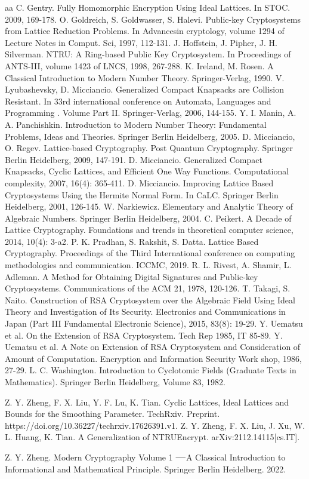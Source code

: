 \documentclass [11pt]{article}
\begin{document}
\begin{thebibliography}{aa}
 C. Gentry.  Fully Homomorphic Encryption Using Ideal Lattices. In  STOC. 2009, 169-178.
 O. Goldreich, S. Goldwasser, S. Halevi.  Public-key Cryptosystems from Lattice Reduction Problems. In Advancesin cryptology, volume 1294 of Lecture Notes in Comput. Sci, 1997, 112-131.
 J. Hoffstein, J. Pipher, J. H. Silverman. NTRU:  A Ring-based Public Key Cryptosystem. In Proceedings of ANTS-III, volume 1423 of LNCS, 1998, 267-288.
 K. Ireland, M. Rosen. A Classical Introduction to Modern Number Theory. Springer-Verlag, 1990.
V. Lyubashevsky, D. Micciancio. Generalized Compact Knapsacks are Collision Resistant.  In 33rd international conference on Automata, Languages and Programming . Volume Part II. Springer-Verlag, 2006, 144-155.
 Y. I. Manin,  A. A. Panchishkin. Introduction to Modern Number Theory: Fundamental Problems, Ideas and Theories. Springer Berlin Heidelberg,  2005.
 D. Micciancio, O. Regev. Lattice-based Cryptography.  Post Quantum Cryptography. Springer Berlin Heidelberg, 2009, 147-191.
D. Micciancio. Generalized Compact Knapsacks, Cyclic Lattices, and Efficient One Way Functions. Computational complexity, 2007, 16(4): 365-411.
D. Micciancio.  Improving Lattice Based Cryptosystems Using the Hermite Normal Form. In CaLC. Springer Berlin  Heidelberg, 2001, 126-145.
W. Narkiewicz. Elementary and Analytic Theory of Algebraic Numbers. Springer Berlin Heidelberg, 2004.
C. Peikert. A Decade of Lattice Cryptography. Foundations and trends in theoretical computer science,  2014, 10(4): 3-a2.
P. K. Pradhan, S. Rakshit, S. Datta. Lattice Based Cryptography. Proceedings of the Third International conference on computing methodologies and communication. ICCMC, 2019.
 R. L. Rivest, A. Shamir, L. Adleman.  A Method for Obtaining Digital Signatures and Public-key Cryptosystems.  Communications of the ACM 21, 1978, 120-126.
     T. Takagi,  S. Naito. Construction of RSA Cryptosystem over the Algebraic Field Using Ideal Theory and Investigation of Its Security. Electronics and Communications in Japan (Part III Fundamental Electronic Science), 2015, 83(8): 19-29.
       Y. Uematsu  et al. On the Extension of RSA Cryptosystem. Tech Rep 1985, IT 85-89.
        Y. Uematsu  et al. A Note on Extension of RSA Cryptosystem and Consideration of Amount of Computation.   Encryption and Information Security Work shop, 1986, 27-29.
 L. C. Washington.  Introduction to Cyclotomic Fields (Graduate Texts in Mathematics). Springer Berlin  Heidelberg,  Volume 83, 1982.

 Z. Y. Zheng, F. X. Liu,  Y. F. Lu,  K. Tian.  Cyclic Lattices,  Ideal Lattices and Bounds for the Smoothing Parameter. TechRxiv. Preprint. https://doi.org/10.36227/techrxiv.17626391.v1.
 Z. Y. Zheng, F. X. Liu,  J. Xu, W. L. Huang,  K. Tian.  A Generalization of NTRUEncrypt. arXiv:2112.14115[cs.IT]. 

 Z. Y. Zheng. Modern Cryptography Volume 1 $\raisebox{0.1mm}{\bf{{---}}}$A Classical Introduction to Informational and Mathematical Principle. Springer Berlin  Heidelberg. 2022.
\end{thebibliography}
\end{document}
